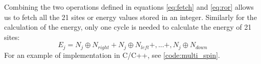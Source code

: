 Combining the two operations defined in equations \eqref{eq:fetch} and \eqref{eq:ror} allows us to fetch all the 21 sites or energy values stored in an integer. Similarly for the calculation of the energy, only one cycle is needed to calculate the energy of 21 sites:
\begin{equation}
E_j =N_j \oplus N_{right}  + N_j \oplus N_{left} +,...+,N_j \oplus N_{down}  
\end{equation} 
For an example of implementation in C/C++, see \ref{code:multi_spin}.










